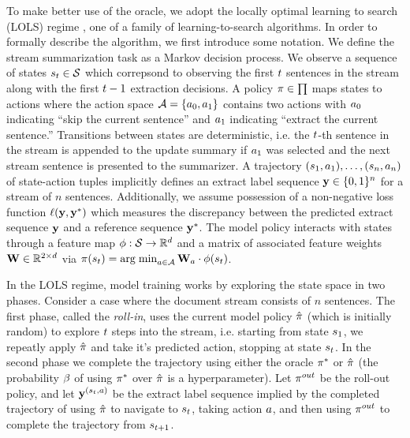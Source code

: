 To make better use of the oracle, we adopt the locally optimal learning to
search (LOLS) regime \citep{chang2015learning}, one of a family of 
learning-to-search algorithms. In order to formally describe the algorithm, we
first introduce some notation. We define the stream summarization task as a 
Markov decision process. We observe a sequence of states $s_t \in 
\mathcal{S}$ which correpsond to observing the first $t$ sentences in 
the stream along with the first $t-1$ extraction decisions. A policy 
$\pi \in \prod$ maps states to
actions where the action space $\mathcal{A} = \{a_0, a_1\}$ contains two 
actions with $a_0$ indicating ``skip the current sentence'' and 
$a_1$ 
indicating ``extract the current sentence.'' 
Transitions between states are deterministic, i.e. the $t$-th 
sentence in the stream is appended to the update summary if $a_1$
was selected and the next stream sentence is presented to the summarizer.
A trajectory $(s_1, a_1), \ldots, (s_n, a_n)$
of state-action tuples
implicitly defines an extract label sequence $\mathbf{y} \in \{0, 1\}^n$
for a stream of $n$ sentences.
Additionally, we assume possession of a non-negative loss function 
$\ell(\mathbf{y}, \mathbf{y}^*)$
which measures the discrepancy between the predicted extract sequence 
$\mathbf{y}$ and a reference sequence $\mathbf{y}^*$.
The model policy interacts with states through a feature
map $\phi : \mathcal{S} \rightarrow \mathbb{R}^{d}$ and a matrix 
of associated feature
weights $\mathbf{W}\in \mathbb{R}^{2 \times d}$ via $\pi(s_t)
= \operatorname{arg\; min}_{a \in \mathcal{A}} 
    \mathbf{W}_a \cdot \phi(s_t)$.


In the LOLS regime, model training works by exploring the state space in 
two phases. Consider a case where the document stream consists of $n$ 
sentences. The first phase, called 
the \textit{roll-in}, uses the current model policy $\hat{\pi}$ (which
is initially random) to explore $t$ steps into the stream, i.e. starting
from state $s_1$, we repeatly apply $\hat{\pi}$ and take it's 
predicted action, stopping at state $s_t$. 
In the second phase we complete the trajectory using either the oracle 
$\pi^{*}$ or $\hat{\pi}$ (the probability $\beta$ of using 
$\pi^{*}$ over $\hat{\pi}$ is a hyperparameter). Let 
$\pi^{out}$ be the roll-out policy, and let 
$\mathbf{y}^{(s_t, a)}$ be the extract label
sequence implied by the completed trajectory of using $\hat{\pi}$
to navigate to $s_t$, taking action $a$, 
and then using $\pi^{out}$ to complete the trajectory from 
$s_{t + 1}$.

